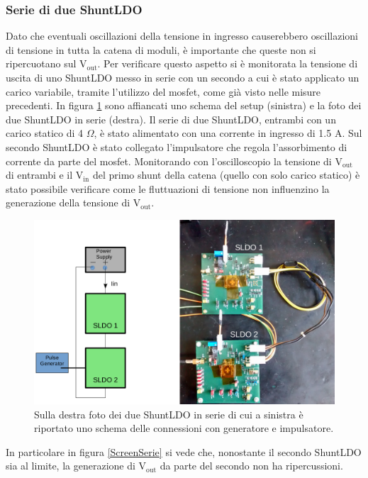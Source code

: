 \subsubsection{Serie di due ShuntLDO}

Dato che eventuali oscillazioni della tensione in ingresso causerebbero oscillazioni di tensione in tutta la catena di moduli, è importante che queste non si ripercuotano sul $\mathrm{V_{out}}$. 
Per verificare questo aspetto si è monitorata la tensione di uscita di uno ShuntLDO messo in serie con un secondo a cui è stato applicato un carico variabile, tramite l'utilizzo del mosfet, come già visto nelle misure precedenti.
In figura \ref{SLDOserie} sono affiancati uno schema del setup (sinistra) e la foto dei due ShuntLDO in serie (destra). 
Il serie di due ShuntLDO, entrambi con un carico statico di 4 $\Omega$, è stato alimentato con una corrente in ingresso di 1.5 A.
Sul secondo ShuntLDO è stato collegato l'impulsatore che regola l'assorbimento di corrente  da parte del mosfet. 
Monitorando con l'oscilloscopio la tensione di $\mathrm{V_{out}}$ di entrambi e il $\mathrm{V_{in}}$ del primo shunt della catena (quello con solo carico statico) è stato possibile verificare come le fluttuazioni di tensione non influenzino la generazione della tensione di $\mathrm{V_{out}}$.
\begin{figure}[h!]
\centering
\includegraphics[scale=.30]{Immagini/SLDOserie}
\caption{Sulla destra foto dei due ShuntLDO in serie di cui a sinistra è riportato uno schema delle connessioni con generatore e impulsatore.}
\label{SLDOserie}
\end{figure}
In particolare in figura \ref{ScreenSerie} si vede che, nonostante il secondo ShuntLDO sia al limite, la generazione di $\mathrm{V_{out}}$ da parte del secondo non ha ripercussioni. 
